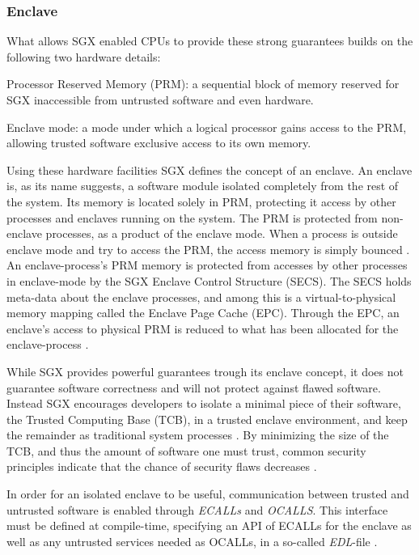 \documentclass[12pt]{article}
\begin{document}
      \subsubsection{Enclave}
      What allows SGX enabled CPUs to provide these strong guarantees builds on the following two hardware details:
      \begin{description}
        \item Processor Reserved Memory (PRM): a sequential block of memory reserved for SGX inaccessible from untrusted software and even hardware.
        \item Enclave mode: a mode under which a logical processor gains access to the PRM, allowing trusted software exclusive access to its own memory.
      \end{description}
      Using these hardware facilities SGX defines the concept of an enclave.
      An enclave is, as its name suggests, a software module isolated completely from the rest of the system.
      Its memory is located solely in PRM, protecting it access by other processes and enclaves running on the system. 
      The PRM is protected from non-enclave processes, as a product of the enclave mode. 
      When a process is outside enclave mode and try to access the PRM, the access memory is simply bounced \cite{intel-sgx-explained}.
      An enclave-process's PRM memory is protected from accesses by other processes in enclave-mode by the SGX Enclave Control Structure (SECS). 
      The SECS holds meta-data about the enclave processes, and among this is a virtual-to-physical memory mapping called the Enclave Page Cache (EPC). 
      Through the EPC, an enclave's access to physical PRM is reduced to what has been allocated for the enclave-process \cite{intel-sgx-explained}.

      While SGX provides powerful guarantees trough its enclave concept, it does not guarantee software correctness and will not protect against flawed software.
      Instead SGX encourages developers to isolate a minimal piece of their software, the Trusted Computing Base (TCB), in a trusted enclave environment, and keep the remainder as traditional system processes \cite{sgx-dev-guide}.
      By minimizing the size of the TCB, and thus the amount of software one must trust, common security principles indicate that the chance of security flaws decreases \cite{sgx-dev-guide}.

      In order for an isolated enclave to be useful, communication between trusted and untrusted software is enabled through \textit{ECALLs} and \textit{OCALLS}.
      This interface must be defined at compile-time, specifying an API of ECALLs for the enclave as well as any untrusted services needed as OCALLs, in a so-called \textit{EDL}-file \cite{sgx-dev-guide}.
\end{document}
